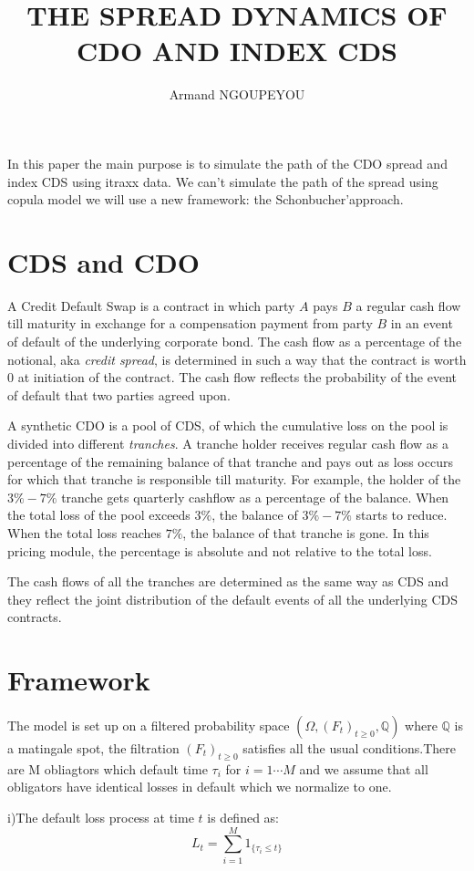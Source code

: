 \documentclass[reqno,11pt,twoside,english]{report}
\def\Q{\mathbb Q}
\newcommand{\1}{{1} \hspace{-0.25 em}{\rm I}}
\begin{document}
\author{Armand NGOUPEYOU}
\title{ THE SPREAD DYNAMICS OF CDO AND  INDEX CDS}
 \maketitle
In this paper the main purpose is to simulate the path of the CDO spread and index CDS using itraxx data. We can't simulate the path of the spread using copula model we will use a new framework: the Schonbucher'approach.

\section{CDS and CDO}
A Credit Default Swap is a contract in which party $A$ pays $B$ a regular cash flow till maturity in exchange for a compensation payment from party $B$ in an event of default of the underlying corporate bond. The cash flow as a percentage of the notional, aka \emph{credit spread}, is determined in such a way that the contract is worth $0$ at initiation of the contract. The cash flow reflects the probability of the event of default that two parties agreed upon.

A synthetic CDO is a pool of CDS, of which the cumulative loss on the pool is divided into different \emph{tranches}. A tranche holder receives regular cash flow as a percentage of the remaining balance of that tranche and pays out as loss occurs for which that tranche is responsible till maturity. For example, the holder of the $3\%-7\%$ tranche gets quarterly cashflow as a percentage of the balance. When the total loss of the pool exceeds $3\%$, the balance of $3\%-7\%$ starts to reduce. When the total loss reaches $7\%$, the balance of that tranche is gone. In this pricing module, the percentage is absolute and not relative to the total loss. 

The cash flows of all the tranches are determined as the same way as CDS and they reflect the joint distribution of the default events of all the underlying CDS contracts.

\section{Framework}
The model is set up on a filtered probability space $(\Omega,{(F_t)}_{t\ge 0},\Q)$ where $\Q$ is a matingale spot, the filtration ${(F_t)}_{t\ge 0}$ satisfies all the usual conditions.There are M obliagtors which default time $\tau_i$ for $i=1\cdots M$  and we assume that all obligators have identical losses in default which we normalize to one. 
\par\medskip
i)The default loss process at time $t$ is defined as:
$$L_t=\sum_{i=1}^M 1_{\{\tau_i\le t\}}$$
\par\medskip
\end{document}
